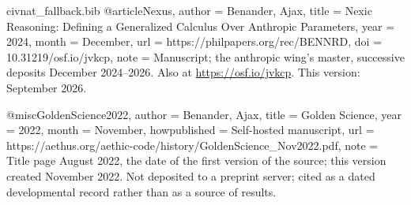 \begin{filecontents}[overwrite]{civnat_fallback.bib}
@article{Nexus,
  author      = {Benander, Ajax},
  title       = {Nexic Reasoning: Defining a Generalized Calculus Over Anthropic Parameters},
  year        = {2024},
  month       = {December},
  url         = {https://philpapers.org/rec/BENNRD},
  doi         = {10.31219/osf.io/jvkcp},
  note        = {Manuscript; the anthropic wing's master, successive deposits
                 December 2024--2026. Also at \url{https://osf.io/jvkcp}.
                 This version: September 2026.}
}

@misc{GoldenScience2022,
  author       = {Benander, Ajax},
  title        = {Golden Science},
  year         = {2022},
  month        = {November},
  howpublished = {Self-hosted manuscript},
  url          = {https://aethus.org/aethic-code/history/GoldenScience_Nov2022.pdf},
  note         = {Title page August 2022, the date of the first version of the source; this version created November 2022. Not deposited to a
                  preprint server; cited as a dated developmental record rather than
                  as a source of results.}
}
\end{filecontents}
